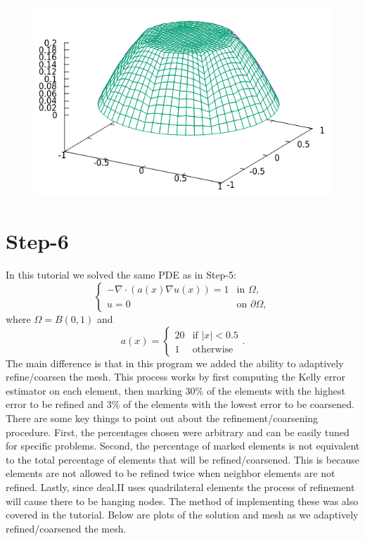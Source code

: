 \documentclass[11pt,fullpage]{article}
\newcommand{\abs}[1]{\left\vert#1\right\vert}
\newcommand{\grad}{\nabla}
\theoremstyle{lemma}
\theoremstyle{definition}
\theoremstyle{lemma}
\begin{document}
\begin{figure}[!ht]
\begin{minipage}{.45\paperwidth}
	\end{minipage}%
	\begin{minipage}{.4\paperwidth}
		\centering
		\includegraphics[scale=.5]{Step5-4.png}
	\end{minipage}
\end{figure}

\section*{Step-6}
In this tutorial we solved the same PDE as in Step-5:
$$
\begin{cases}
-\grad \cdot(a(x)\grad u(x)) = 1 &\text{in }\Omega,\\
u = 0 & \text{on }\partial\Omega,
\end{cases}
$$
where $\Omega = B(0,1)$ and 
$$
a(x) = \begin{cases}
20 & \text{if }\abs{x} < 0.5\\
1 & \text{otherwise}
\end{cases}.
$$
The main difference is that in this program we added the ability to adaptively refine/coarsen the mesh. This process works by first computing the Kelly error estimator on each element, then marking 30\% of the elements with the highest error to be refined and 3\% of the elements with the lowest error to be coarsened. There are some key things to point out about the refinement/coarsening procedure. First, the percentages chosen were arbitrary and can be easily tuned for specific problems. Second, the percentage of marked elements is not equivalent to the total percentage of elements that will be refined/coarsened. This is because elements are not allowed to be refined twice when neighbor elements are not refined. Lastly, since deal.II uses quadrilateral elements the process of refinement will cause there to be hanging nodes. The method of implementing these was also covered in the tutorial. Below are plots of the solution and mesh as we adaptively refined/coarsened the mesh.
\end{document}
